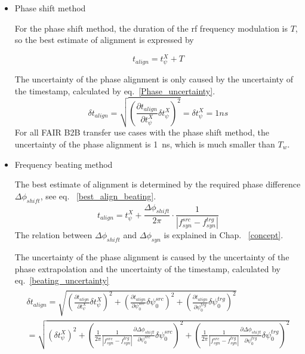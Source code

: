 \begin{itemize}
\item Phase shift method

For the phase shift method, the duration of the rf frequency modulation is $T$, so the best estimate of alignment is expressed by 

\begin{equation}
t_\mathit{align} = t_{\psi}^X + T \label{Phase_win}
\end{equation}

The uncertainty of the phase alignment is only caused by the uncertainty of the timestamp, calculated by eq.~\ref{Phase_uncertainty}.
\begin{equation}
\delta t_\mathit{align} =\sqrt {(\frac {\partial t_\mathit{align}}{\partial t_{\psi}^X}\delta t_{\psi}^X)^2} =\delta t_{\psi}^X=1ns
\label{Phase_uncertainty}
\end{equation}
For all FAIR B2B transfer use cases with the phase shift method, the uncertainty of the phase alignment is \SI{1}{ns}, which is much smaller than $T_\mathit{w}$.

\item Frequency beating method

The best estimate of alignment is determined by the required phase difference $\Delta \phi_\mathit{shift}$, see eq. ~\ref{best_align_beating}.
\begin{equation}
t_\mathit{align}= t_\psi^\mathit{X}+\frac{\Delta \phi_\mathit{shift}}{2\pi}\cdot\frac{1}{|f_{\mathit{syn}}^\mathit{src}-f_{\mathit{syn}}^\mathit{trg}|}
\label{best_align_beating}
\end{equation}
The relation between $\Delta \phi_\mathit{shift}$ and $\Delta \phi_\mathit{syn}$ is explained in Chap. ~\ref{concept}. 

The uncertainty of the phase alignment is caused by the uncertainty of the phase extrapolation and the uncertainty of the timestamp, calculated by eq.~\ref{beating_uncertainty}
\begin{eqnarray}
\begin{aligned}
\delta t_\mathit{align} =\sqrt {(\frac {\partial t_\mathit{align}}{\partial t_\psi^\mathit{X}} \delta t_\psi^\mathit{X})^2 +(\frac {\partial t_\mathit{align}}{\partial \psi^\mathit{src}_0} \delta\psi^\mathit{src}_0)^2+(\frac {\partial t_\mathit{align}}{\partial \psi^\mathit{trg}_0} \delta\psi^\mathit{trg}_0)^2  }\\
=\sqrt {(\delta t_\psi^\mathit{X})^2 +(\frac{1}{2\pi}\frac{1}{|f_{\mathit{syn}}^\mathit{src}-f_{\mathit{syn}}^\mathit{trg}|}\frac {\partial \Delta \phi_\mathit{shift}}{\partial \psi^\mathit{src}_0}  \delta  \psi^\mathit{src}_0)^2 +(\frac{1}{2\pi}\frac{1}{|f_{\mathit{syn}}^\mathit{src}-f_{\mathit{syn}}^\mathit{trg}|}\frac {\partial \Delta \phi_\mathit{shift}}{\partial \psi^\mathit{trg}_0}  \delta  \psi^\mathit{trg}_0)^2}\\
\label{beating_uncertainty}
\end{aligned}
\end{eqnarray}


\end{itemize}

